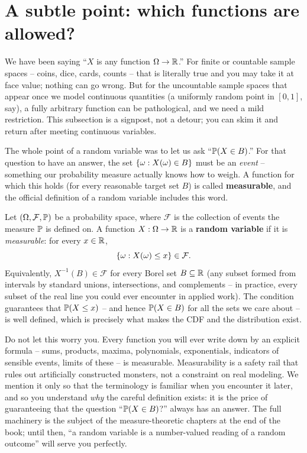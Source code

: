 \section{A subtle point: which functions are allowed?}
\label{ch06:measurability}

We have been saying ``$X$ is any function $\Omega \to \R$.'' For finite or countable
sample spaces -- coins, dice, cards, counts -- that is literally true and you may take
it at face value; nothing can go wrong. But for the uncountable sample spaces that
appear once we model continuous quantities (a uniformly random point in $[0,1]$, say),
a fully arbitrary function can be pathological, and we need a mild restriction. This
subsection is a signpost, not a detour; you can skim it and return after meeting
continuous variables.

The whole point of a random variable was to let us ask ``$\P(X \in B)$.'' For that
question to have an answer, the set $\set{\omega : X(\omega) \in B}$ must be an
\emph{event} -- something our probability measure actually knows how to weigh. A
function for which this holds (for every reasonable target set $B$) is called
\textbf{measurable}, and the official definition of a random variable includes this
word.

\begin{formalbox}
Let $(\Omega, \mathcal{F}, \P)$ be a probability space, where $\mathcal{F}$ is the
collection of events the measure $\P$ is defined on. A function $X : \Omega \to \R$ is a
\textbf{random variable} if it is \emph{measurable}: for every $x \in \R$,
\[
  \set{\omega : X(\omega) \le x} \in \mathcal{F}.
\]
Equivalently, $X^{-1}(B) \in \mathcal{F}$ for every Borel set $B \subseteq \R$
(any subset formed from intervals by standard unions, intersections, and complements --
in practice, every subset of the real line you could ever encounter in applied work).
The condition guarantees that $\P(X \le x)$ -- and hence $\P(X \in B)$ for all the sets we
care about -- is well defined, which is precisely what makes the CDF and the
distribution exist.
\end{formalbox}

Do not let this worry you. Every function you will ever write down by an explicit
formula -- sums, products, maxima, polynomials, exponentials, indicators of sensible
events, limits of these -- is measurable. Measurability is a safety rail that rules out
artificially constructed monsters, not a constraint on real modeling. We mention it
only so that the terminology is familiar when you encounter it later, and so you understand
\emph{why} the careful definition exists: it is the price of guaranteeing that the question
``$\P(X \in B)$?'' always has an answer. The full machinery is the subject of the
measure-theoretic chapters at the end of the book; until then, ``a random variable is a
number-valued reading of a random outcome'' will serve you perfectly.

